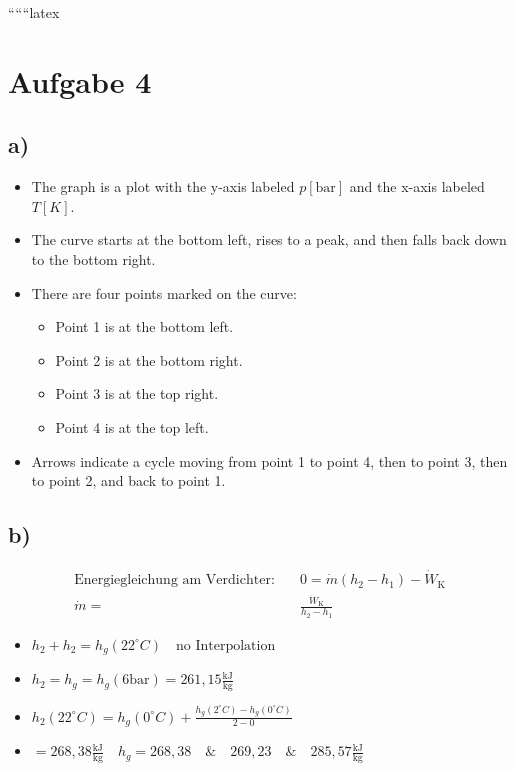 
``````latex


\section*{Aufgabe 4}

\subsection*{a)}

\begin{itemize}
    \item The graph is a plot with the y-axis labeled $p[\text{bar}]$ and the x-axis labeled $T[K]$.
    \item The curve starts at the bottom left, rises to a peak, and then falls back down to the bottom right.
    \item There are four points marked on the curve: 
        \begin{itemize}
            \item Point 1 is at the bottom left.
            \item Point 2 is at the bottom right.
            \item Point 3 is at the top right.
            \item Point 4 is at the top left.
        \end{itemize}
    \item Arrows indicate a cycle moving from point 1 to point 4, then to point 3, then to point 2, and back to point 1.
\end{itemize}

\subsection*{b)}

\begin{align*}
    \text{Energiegleichung am Verdichter:} \quad & 0 = \dot{m} (h_{2} - h_{1}) - \dot{W}_{\text{K}} \\
    \dot{m} = \quad & \frac{\dot{W}_{\text{K}}}{h_{2} - h_{1}}
\end{align*}

\begin{itemize}
    \item $h_{2} + h_{2} = h_{g} (22^{\circ}C) \quad \text{no Interpolation}$
    \item $h_{2} = h_{g} = h_{g} (6 \text{bar}) = 261,15 \frac{\text{kJ}}{\text{kg}}$
    \item $h_{2} (22^{\circ}C) = h_{g} (0^{\circ}C) + \frac{h_{g} (2^{\circ}C) - h_{g} (0^{\circ}C)}{2 - 0}$
    \item $= 268,38 \frac{\text{kJ}}{\text{kg}} \quad h_{g} = 268,38 \quad \& \quad 269,23 \quad \& \quad 285,57 \frac{\text{kJ}}{\text{kg}}$
\end{itemize}

